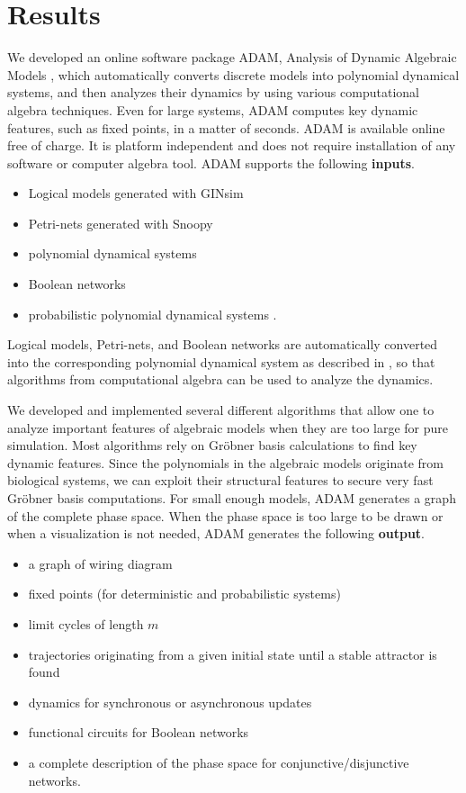 \documentclass[11pt]{amsart}
\begin{document}
\section{Results}
We developed an
online software package ADAM, Analysis of Dynamic Algebraic Models \cite{ADAM}, which automatically converts discrete models into polynomial dynamical
systems, and then analyzes their dynamics by using various computational algebra techniques. Even for large systems, ADAM
computes key dynamic features, such as fixed points, in a matter of seconds.
ADAM is available online free of charge. It is platform
independent and does not require installation of any software or computer
algebra tool. 
ADAM supports the following {\bf inputs}.
\begin{itemize}
  \item Logical models generated with GINsim \cite{GINsim}
  \item Petri-nets generated with Snoopy \cite{Snoopy}
  \item polynomial dynamical systems
  \item Boolean networks
  \item probabilistic polynomial dynamical systems \cite{shmulevich}.
\end{itemize}
Logical models, Petri-nets, and Boolean networks are automatically converted
into the corresponding polynomial dynamical system as described in
\cite{Alan:Bioinf2010}, so that algorithms from computational
algebra can be used to analyze the dynamics. 

We developed and implemented several different algorithms that allow one to analyze 
important features of algebraic models when they are too large for pure simulation. 
Most algorithms rely on Gr\"obner basis calculations to find key dynamic
features. 
Since the polynomials in the algebraic
models originate from biological systems, we can exploit their structural
features to secure very fast Gr\"obner basis computations. 
For small enough models, ADAM generates a graph of the complete phase space.
When the phase space is too large to be drawn or when a visualization is not
needed, ADAM generates the following {\bf output}.
\begin{itemize}
  \item a graph of wiring diagram
  \item fixed points (for deterministic and probabilistic systems)
  \item limit cycles of length $m$
  \item trajectories originating from a given initial state until a stable
  attractor is found
  \item dynamics for synchronous or asynchronous updates
  \item functional circuits for Boolean networks
  \item a complete description of the phase space for conjunctive/disjunctive
  networks.
\end{itemize}
\end{document}
